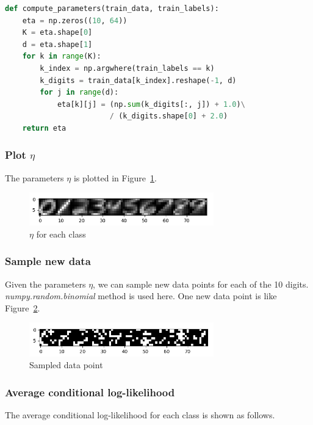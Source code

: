 \documentclass[a4paper]{article}
\begin{document}
\begin{lstlisting}[language = Python]
def compute_parameters(train_data, train_labels):
    eta = np.zeros((10, 64))
    K = eta.shape[0]
    d = eta.shape[1]
    for k in range(K):
        k_index = np.argwhere(train_labels == k)
        k_digits = train_data[k_index].reshape(-1, d)
        for j in range(d):
            eta[k][j] = (np.sum(k_digits[:, j]) + 1.0)\
                        / (k_digits.shape[0] + 2.0)
    return eta
\end{lstlisting}

\subsubsection{Plot $\eta$}
The parameters $\eta$ is plotted in Figure~\ref{fig: Plot_eta}.

\begin{figure}[htbp]
\centering
\includegraphics[width = 8cm]{Plot_eta}
\caption{$\eta$ for each class}
\label{fig: Plot_eta}
\end{figure}

\subsubsection{Sample new data}

Given the parameters $\eta$, we can sample new data points for each of the 10 digits. \textit{numpy.random.binomial} method is used here. One new data point is like Figure~\ref{fig: New_data}.

\begin{figure}[htbp]
\centering
\includegraphics[width = 8cm]{New_data}
\caption{Sampled data point}
\label{fig: New_data}
\end{figure}

\subsubsection{Average conditional log-likelihood}

The average conditional log-likelihood for each class is shown as follows.
\end{document}
